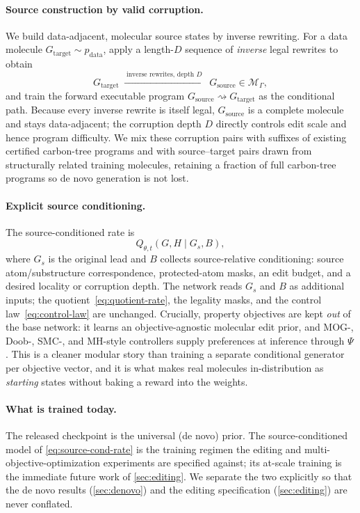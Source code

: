 \documentclass{article}
\newcommand{\M}{\mathcal{M}_{\Gamma}}
\newcommand{\pdata}{p_{\mathrm{data}}}
\theoremstyle{definition}
\theoremstyle{remark}
\begin{document}
\paragraph{Source construction by valid corruption.}
We build data-adjacent, molecular source states by inverse rewriting. For a data molecule $G_{\mathrm{target}}\sim\pdata$, apply a length-$D$ sequence of \emph{inverse} legal rewrites to obtain
\begin{equation}
G_{\mathrm{target}}\;\xrightarrow{\;\text{inverse rewrites, depth }D\;}\;G_{\mathrm{source}}\in\M,
\end{equation}
and train the forward executable program $G_{\mathrm{source}}\rightsquigarrow G_{\mathrm{target}}$ as the conditional path. Because every inverse rewrite is itself legal, $G_{\mathrm{source}}$ is a complete molecule and stays data-adjacent; the corruption depth $D$ directly controls edit scale and hence program difficulty. We mix these corruption pairs with suffixes of existing certified carbon-tree programs and with source--target pairs drawn from structurally related training molecules, retaining a fraction of full carbon-tree programs so de novo generation is not lost.

\paragraph{Explicit source conditioning.}
The source-conditioned rate is
\begin{equation}
Q_{\theta,t}(G,H\mid G_s,B),
\label{eq:source-cond-rate}
\end{equation}
where $G_s$ is the original lead and $B$ collects source-relative conditioning: source atom/substructure correspondence, protected-atom masks, an edit budget, and a desired locality or corruption depth. The network reads $G_s$ and $B$ as additional inputs; the quotient~\eqref{eq:quotient-rate}, the legality masks, and the control law~\eqref{eq:control-law} are unchanged. Crucially, property objectives are kept \emph{out} of the base network: it learns an objective-agnostic molecular edit prior, and MOG-, Doob-, SMC-, and MH-style controllers supply preferences at inference through $\Psi$. This is a cleaner modular story than training a separate conditional generator per objective vector, and it is what makes real molecules in-distribution as \emph{starting} states without baking a reward into the weights.

\paragraph{What is trained today.}
The released checkpoint is the universal (de novo) prior. The source-conditioned model of \eqref{eq:source-cond-rate} is the training regimen the editing and multi-objective-optimization experiments are specified against; its at-scale training is the immediate future work of \cref{sec:editing}. We separate the two explicitly so that the de novo results (\cref{sec:denovo}) and the editing specification (\cref{sec:editing}) are never conflated.
\end{document}
